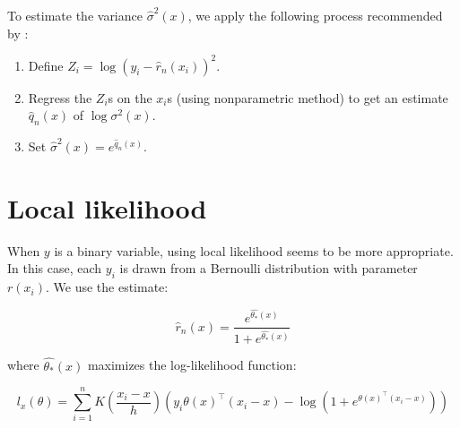 \documentclass[11pt,letterpaper]{article}
\theoremstyle{definition}
\begin{document}
To estimate the variance $\hat{\sigma}^2(x)$, we apply the following process recommended by \cite{wasserman2006all}:
\begin{enumerate}
\item Define $Z_i = \log(y_i - \hat{r}_n(x_i))^2$.
\item Regress the $Z_i$s on the $x_i$s (using nonparametric method) to get an estimate $\hat{q}_n(x)$ of $\log\sigma^2(x)$.
\item Set $\hat{\sigma}^2(x) = e^{\hat{q}_n(x)}$.
\end{enumerate}

\section{Local likelihood}

When $y$ is a binary variable, using local likelihood seems to be more appropriate. In this case, each $y_i$ is drawn from a Bernoulli distribution with parameter $r(x_i)$. We use the estimate:

$$\hat{r}_n(x) = \frac{e^{\hat{\theta_*}(x)}}{1 + e^{\hat{\theta_*}(x)}}$$

where $\hat{\theta_*}(x)$ maximizes the log-likelihood function:

$$l_x(\theta) = \sum_{i=1}^n K\left(\frac{x_i - x}{h}\right)\left(y_i\theta(x)^{\top}(x_i - x) - \log(1 + e^{\theta(x)^{\top}(x_i - x)})\right)$$


\end{document}

